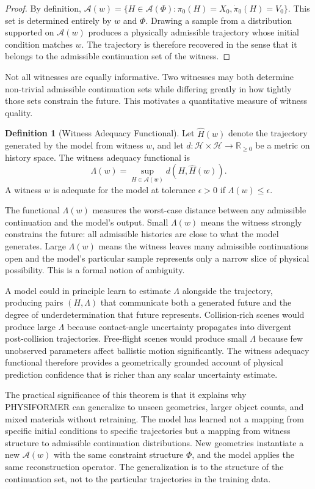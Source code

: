 \documentclass[12pt,oneside]{article}
\theoremstyle{definition}
\newtheorem{definition}[theorem]{Definition}
\newcommand{\A}{\mathcal{A}}
\newcommand{\H}{\mathcal{H}}
\begin{document}
\begin{proof}
By definition, \(\A(w) = \{H \in \A(\Phi) : \pi_0(H) = X_0, \dot\pi_0(H) = V_0\}\).
This set is determined entirely by \(w\) and \(\Phi\). Drawing a sample from a
distribution supported on \(\A(w)\) produces a physically admissible trajectory
whose initial condition matches \(w\). The trajectory is therefore recovered in
the sense that it belongs to the admissible continuation set of the witness.
\end{proof}

Not all witnesses are equally informative. Two witnesses may both determine
non-trivial admissible continuation sets while differing greatly in how tightly
those sets constrain the future. This motivates a quantitative measure of witness
quality.

\begin{definition}[Witness Adequacy Functional]
Let \(\hat{H}(w)\) denote the trajectory generated by the model from witness \(w\),
and let \(d : \H \times \H \to \mathbb{R}_{\geq 0}\) be a metric on history space.
The witness adequacy functional is
\[
\Lambda(w) = \sup_{H \in \A(w)} d(H, \hat{H}(w)).
\]
A witness \(w\) is adequate for the model at tolerance \(\epsilon > 0\) if
\(\Lambda(w) \leq \epsilon\).
\end{definition}

The functional \(\Lambda(w)\) measures the worst-case distance between any
admissible continuation and the model's output. Small \(\Lambda(w)\) means
the witness strongly constrains the future: all admissible histories are close
to what the model generates. Large \(\Lambda(w)\) means the witness leaves many
admissible continuations open and the model's particular sample represents only
a narrow slice of physical possibility. This is a formal notion of ambiguity.

A model could in principle learn to estimate \(\Lambda\) alongside the trajectory,
producing pairs \((H, \Lambda)\) that communicate both a generated future and the
degree of underdetermination that future represents. Collision-rich scenes would
produce large \(\Lambda\) because contact-angle uncertainty propagates into divergent
post-collision trajectories. Free-flight scenes would produce small \(\Lambda\)
because few unobserved parameters affect ballistic motion significantly. The witness
adequacy functional therefore provides a geometrically grounded account of physical
prediction confidence that is richer than any scalar uncertainty estimate.

The practical significance of this theorem is that it explains why PHYSIFORMER
can generalize to unseen geometries, larger object counts, and mixed materials
without retraining. The model has learned not a mapping from specific initial
conditions to specific trajectories but a mapping from witness structure to
admissible continuation distributions. New geometries instantiate a new \(\A(w)\)
with the same constraint structure \(\Phi\), and the model applies the same
reconstruction operator. The generalization is to the structure of the continuation
set, not to the particular trajectories in the training data.
\end{document}
